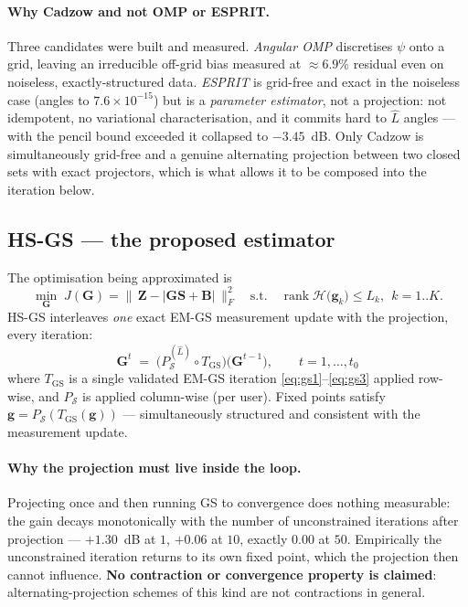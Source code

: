 \documentclass[11pt,a4paper]{article}
\newcommand{\mat}[1]{\mathbf{#1}}
\newcommand{\vect}[1]{\mathbf{#1}}
\newcommand{\Hop}{\mathcal{H}}
\newcommand{\rank}{\operatorname{rank}}
\begin{document}
\paragraph{Why Cadzow and not OMP or ESPRIT.} Three candidates were built and
measured. \emph{Angular OMP} discretises $\psi$ onto a grid, leaving an
irreducible off-grid bias measured at $\approx6.9\%$ residual even on
noiseless, exactly-structured data. \emph{ESPRIT} is grid-free and exact in
the noiseless case (angles to $7.6\times10^{-15}$) but is a \emph{parameter
estimator}, not a projection: not idempotent, no variational
characterisation, and it commits hard to $\hat L$ angles --- with the pencil
bound exceeded it collapsed to $-3.45$~dB. Only Cadzow is simultaneously
grid-free and a genuine alternating projection between two closed sets with
exact projectors, which is what allows it to be composed into the iteration
below.

\subsection{HS-GS --- the proposed estimator}
The optimisation being approximated is
\begin{equation}
\min_{\mat{G}}\;
J(\mat{G}) = \bigl\|\,\mat{Z}-|\mat{G}\mat{S}+\mat{B}|\,\bigr\|_F^2
\quad\text{s.t.}\quad
\rank\Hop\bigl(\vect{g}_k\bigr)\le L_k,\ \ k=1..K .
\label{eq:hsgsprob}
\end{equation}
HS-GS interleaves \emph{one} exact EM-GS measurement update with the
projection, every iteration:
\begin{equation}
\boxed{\;
\mat{G}^{t} \;=\;
\bigl(P_{\mathcal S}^{(\hat L)}\circ T_{\mathrm{GS}}\bigr)\bigl(\mat{G}^{t-1}\bigr),
\qquad t=1,\dots,t_0 \;}
\label{eq:hsgs}
\end{equation}
where $T_{\mathrm{GS}}$ is a single validated EM-GS iteration
\eqref{eq:gs1}--\eqref{eq:gs3} applied row-wise, and $P_{\mathcal S}$ is
applied column-wise (per user). Fixed points satisfy
$\vect{g}=P_{\mathcal S}(T_{\mathrm{GS}}(\vect{g}))$ --- simultaneously
structured and consistent with the measurement update.

\paragraph{Why the projection must live inside the loop.} Projecting once and
then running GS to convergence does nothing measurable: the gain decays
monotonically with the number of unconstrained iterations after projection ---
$+1.30$~dB at $1$, $+0.06$ at $10$, exactly $0.00$ at $50$. Empirically the
unconstrained iteration returns to its own fixed point, which the projection
then cannot influence. \textbf{No contraction or convergence property is
claimed}: alternating-projection schemes of this kind are not contractions in
general.
\end{document}
